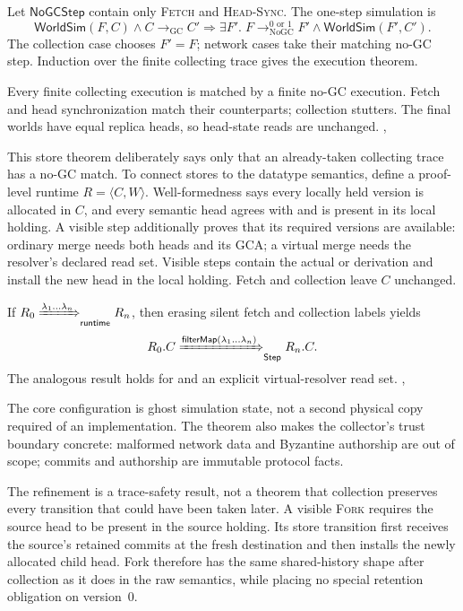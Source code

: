 Let $\mathsf{NoGCStep}$ contain only \textsc{Fetch} and
\textsc{Head-Sync}. The one-step simulation is
\[
 \mathsf{WorldSim}(F,C)\land C\longrightarrow_{\mathrm{GC}}C'
 \Longrightarrow
 \exists F'.\;F\longrightarrow_{\mathrm{NoGC}}^{0\text{ or }1}F'
 \land\mathsf{WorldSim}(F',C').
\]
The collection case chooses $F'=F$; network cases take their matching
no-GC step. Induction over the finite collecting trace gives the execution
theorem.

\begin{theorem}
Every finite collecting execution is matched by a finite no-GC execution.
Fetch and head synchronization match their counterparts; collection
stutters. The final worlds have equal replica heads, so head-state reads are
unchanged.
\hfill{}, 
\end{theorem}

This store theorem deliberately says only that an already-taken collecting
trace has a no-GC match. To connect stores to the datatype semantics, define a
proof-level runtime $R=\langle C,W\rangle$. Well-formedness says every locally
held version is allocated in $C$, and every semantic head agrees with and is
present in its local holding. A visible step additionally proves that its
required versions are available: ordinary merge needs both heads and its GCA;
a virtual merge needs the resolver's declared read set. Visible steps contain
the actual  or  derivation and install the new head in
the local holding. Fetch and collection leave $C$ unchanged.

\begin{theorem}
If
$R_0\xRightarrow{\lambda_1\ldots\lambda_n}_{\mathsf{runtime}}R_n$, then
erasing silent fetch and collection labels yields
\[
 R_0.C\xRightarrow{\mathsf{filterMap}(\lambda_1\ldots\lambda_n)}_{\mathsf{Step}}
 R_n.C.
\]
The analogous result holds for  and an explicit virtual-resolver
read set.
\hfill{},
\end{theorem}

The core configuration is ghost simulation state, not a second physical copy
required of an implementation. The theorem also makes the collector's trust
boundary concrete: malformed network data and Byzantine authorship are out of
scope; commits and authorship are immutable protocol facts.

The refinement is a trace-safety result, not a theorem that collection
preserves every transition that could have been taken later. A visible
\textsc{Fork} requires the source head to be present in the source holding. Its
store transition first receives the source's retained commits at the fresh
destination and then installs the newly allocated child head. Fork therefore
has the same shared-history shape after collection as it does in the raw
semantics, while placing no special retention obligation on version~0.

